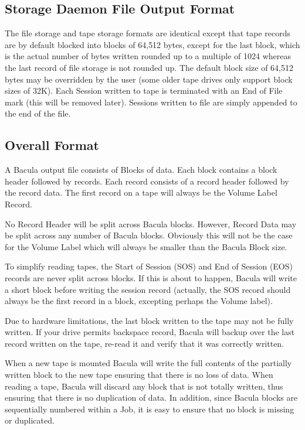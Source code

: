\subsection*{Storage Daemon File Output Format}

The file storage and tape storage formats are identical except that tape
records are by default blocked into blocks of 64,512 bytes, except for the
last block, which is the actual number of bytes written rounded up to a
multiple of 1024 whereas the last record of file storage is not rounded up.
The default block size of 64,512 bytes may be overridden by the user (some
older tape drives only support block sizes of 32K). Each Session written to
tape is terminated with an End of File mark (this will be removed later).
Sessions written to file are simply appended to the end of the file. 

\subsection*{Overall Format}

A Bacula output file consists of Blocks of data. Each block contains a block
header followed by records. Each record consists of a record header followed
by the record data. The first record on a tape will always be the Volume Label
Record. 

No Record Header will be split across Bacula blocks. However, Record Data may
be split across any number of Bacula blocks. Obviously this will not be the
case for the Volume Label which will always be smaller than the Bacula Block
size. 

To simplify reading tapes, the Start of Session (SOS) and End of Session (EOS)
records are never split across blocks. If this is about to happen, Bacula will
write a short block before writing the session record (actually, the SOS
record should always be the first record in a block, excepting perhaps the
Volume label). 

Due to hardware limitations, the last block written to the tape may not be
fully written. If your drive permits backspace record, Bacula will backup over
the last record written on the tape, re-read it and verify that it was
correctly written. 

When a new tape is mounted Bacula will write the full contents of the
partially written block to the new tape ensuring that there is no loss of
data. When reading a tape, Bacula will discard any block that is not totally
written, thus ensuring that there is no duplication of data. In addition,
since Bacula blocks are sequentially numbered within a Job, it is easy to
ensure that no block is missing or duplicated. 

